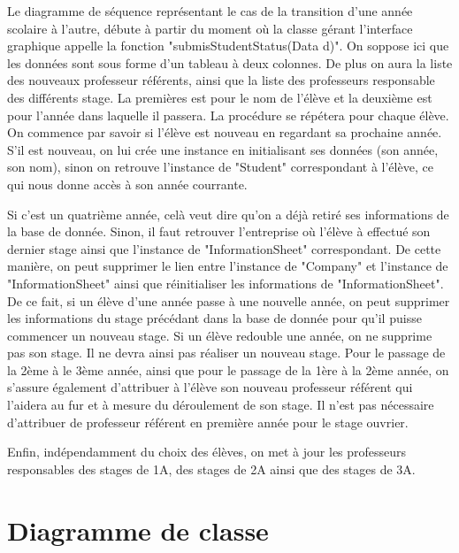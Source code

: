 \documentclass{scrreprt}
\begin{document}
	Le diagramme de séquence représentant le cas de la transition d'une année scolaire à l'autre, débute à partir du moment
où la classe gérant l'interface graphique appelle la fonction "submisStudentStatus(Data d)". On soppose ici que les données
sont sous forme d'un tableau à deux colonnes. De plus on aura la liste des nouveaux professeur référents, ainsi que la liste des professeurs
responsable des différents stage. La premières est pour le nom de l'élève et la deuxième est pour l'année dans laquelle
il passera. La procédure se répétera pour chaque élève. On commence par savoir si l'élève est nouveau en regardant sa prochaine année.
S'il est nouveau, on lui crée une instance en initialisant ses données (son année, son nom), sinon on retrouve l'instance de "Student" 
correspondant à l'élève, ce qui nous donne accès à son année courrante. 

	Si c'est un quatrième année, celà veut dire qu'on a déjà retiré ses informations de la base de donnée. Sinon, il faut retrouver 
l'entreprise où l'élève à effectué son dernier stage ainsi que l'instance de "InformationSheet" correspondant. De cette manière, on peut 
supprimer le lien entre l'instance de "Company" et l'instance de "InformationSheet" ainsi que réinitialiser les informations de 
"InformationSheet". De ce fait, si un élève d'une année passe à une nouvelle année, on peut supprimer les informations du stage précédant 
dans la base de donnée pour qu'il puisse commencer un nouveau stage. Si un élève redouble une année, on ne supprime pas son stage. Il ne 
devra ainsi pas réaliser un nouveau stage. Pour le passage de la 2ème à le 3ème année, ainsi que pour le passage de la 1ère à la 2ème année, 
on s'assure également d'attribuer à l'élève son nouveau professeur référent qui l'aidera au fur et à mesure du déroulement de son stage. 
Il n'est pas nécessaire d'attribuer de professeur référent en première année pour le stage ouvrier. 

	Enfin, indépendamment du choix des élèves, on met à jour les professeurs responsables des stages de 1A, des stages de 2A ainsi que 
des stages de 3A.  

\newpage

\newpage
\chapter{Diagramme de classe}
\end{document}
